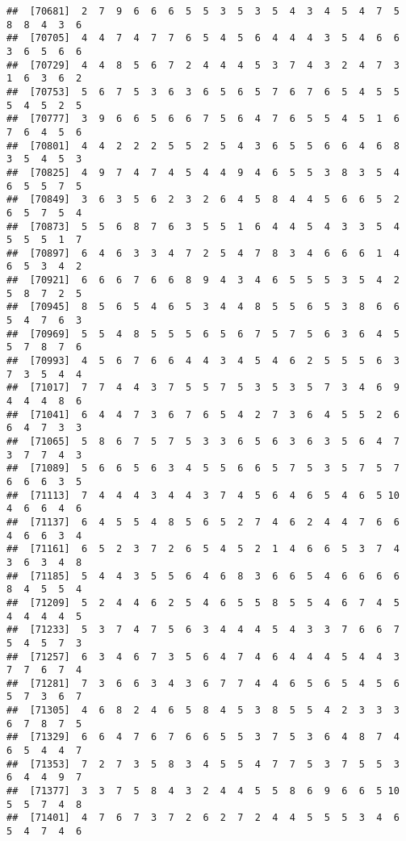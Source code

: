\documentclass[
]{book}
\begin{document}
\begin{verbatim}
##  [70681]  2  7  9  6  6  6  5  5  3  5  3  5  4  3  4  5  4  7  5  8  8  4  3  6
##  [70705]  4  4  7  4  7  7  6  5  4  5  6  4  4  4  3  5  4  6  6  3  6  5  6  6
##  [70729]  4  4  8  5  6  7  2  4  4  4  5  3  7  4  3  2  4  7  3  1  6  3  6  2
##  [70753]  5  6  7  5  3  6  3  6  5  6  5  7  6  7  6  5  4  5  5  5  4  5  2  5
##  [70777]  3  9  6  6  5  6  6  7  5  6  4  7  6  5  5  4  5  1  6  7  6  4  5  6
##  [70801]  4  4  2  2  2  5  5  2  5  4  3  6  5  5  6  6  4  6  8  3  5  4  5  3
##  [70825]  4  9  7  4  7  4  5  4  4  9  4  6  5  5  3  8  3  5  4  6  5  5  7  5
##  [70849]  3  6  3  5  6  2  3  2  6  4  5  8  4  4  5  6  6  5  2  6  5  7  5  4
##  [70873]  5  5  6  8  7  6  3  5  5  1  6  4  4  5  4  3  3  5  4  5  5  5  1  7
##  [70897]  6  4  6  3  3  4  7  2  5  4  7  8  3  4  6  6  6  1  4  6  5  3  4  2
##  [70921]  6  6  6  7  6  6  8  9  4  3  4  6  5  5  5  3  5  4  2  5  8  7  2  5
##  [70945]  8  5  6  5  4  6  5  3  4  4  8  5  5  6  5  3  8  6  6  5  4  7  6  3
##  [70969]  5  5  4  8  5  5  5  6  5  6  7  5  7  5  6  3  6  4  5  5  7  8  7  6
##  [70993]  4  5  6  7  6  6  4  4  3  4  5  4  6  2  5  5  5  6  3  7  3  5  4  4
##  [71017]  7  7  4  4  3  7  5  5  7  5  3  5  3  5  7  3  4  6  9  4  4  4  8  6
##  [71041]  6  4  4  7  3  6  7  6  5  4  2  7  3  6  4  5  5  2  6  6  4  7  3  3
##  [71065]  5  8  6  7  5  7  5  3  3  6  5  6  3  6  3  5  6  4  7  3  7  7  4  3
##  [71089]  5  6  6  5  6  3  4  5  5  6  6  5  7  5  3  5  7  5  7  6  6  6  3  5
##  [71113]  7  4  4  4  3  4  4  3  7  4  5  6  4  6  5  4  6  5 10  4  6  6  4  6
##  [71137]  6  4  5  5  4  8  5  6  5  2  7  4  6  2  4  4  7  6  6  4  6  6  3  4
##  [71161]  6  5  2  3  7  2  6  5  4  5  2  1  4  6  6  5  3  7  4  3  6  3  4  8
##  [71185]  5  4  4  3  5  5  6  4  6  8  3  6  6  5  4  6  6  6  6  8  4  5  5  4
##  [71209]  5  2  4  4  6  2  5  4  6  5  5  8  5  5  4  6  7  4  5  4  4  4  4  5
##  [71233]  5  3  7  4  7  5  6  3  4  4  4  5  4  3  3  7  6  6  7  5  4  5  7  3
##  [71257]  6  3  4  6  7  3  5  6  4  7  4  6  4  4  4  5  4  4  3  7  7  6  7  4
##  [71281]  7  3  6  6  3  4  3  6  7  7  4  4  6  5  6  5  4  5  6  5  7  3  6  7
##  [71305]  4  6  8  2  4  6  5  8  4  5  3  8  5  5  4  2  3  3  3  6  7  8  7  5
##  [71329]  6  6  4  7  6  7  6  6  5  5  3  7  5  3  6  4  8  7  4  6  5  4  4  7
##  [71353]  7  2  7  3  5  8  3  4  5  5  4  7  7  5  3  7  5  5  3  6  4  4  9  7
##  [71377]  3  3  7  5  8  4  3  2  4  4  5  5  8  6  9  6  6  5 10  5  5  7  4  8
##  [71401]  4  7  6  7  3  7  2  6  2  7  2  4  4  5  5  5  3  4  6  5  4  7  4  6

\end{verbatim}
\end{document}
